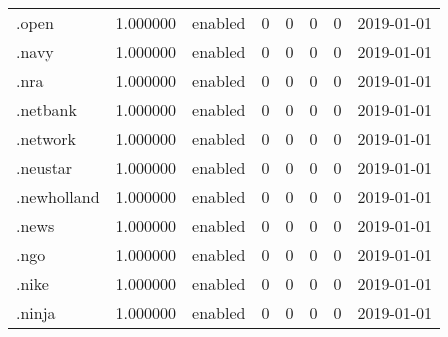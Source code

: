 \begin{tabular}{lrlrrrrl}
.open                     &          1.000000 &         enabled &                           0 &                           0 &                           0 &                   0 &           2019-01-01 \\
.navy                     &          1.000000 &         enabled &                           0 &                           0 &                           0 &                   0 &           2019-01-01 \\
.nra                      &          1.000000 &         enabled &                           0 &                           0 &                           0 &                   0 &           2019-01-01 \\
.netbank                  &          1.000000 &         enabled &                           0 &                           0 &                           0 &                   0 &           2019-01-01 \\
.network                  &          1.000000 &         enabled &                           0 &                           0 &                           0 &                   0 &           2019-01-01 \\
.neustar                  &          1.000000 &         enabled &                           0 &                           0 &                           0 &                   0 &           2019-01-01 \\
.newholland               &          1.000000 &         enabled &                           0 &                           0 &                           0 &                   0 &           2019-01-01 \\
.news                     &          1.000000 &         enabled &                           0 &                           0 &                           0 &                   0 &           2019-01-01 \\
.ngo                      &          1.000000 &         enabled &                           0 &                           0 &                           0 &                   0 &           2019-01-01 \\
.nike                     &          1.000000 &         enabled &                           0 &                           0 &                           0 &                   0 &           2019-01-01 \\
.ninja                    &          1.000000 &         enabled &                           0 &                           0 &                           0 &                   0 &           2019-01-01 \\

\end{tabular}
